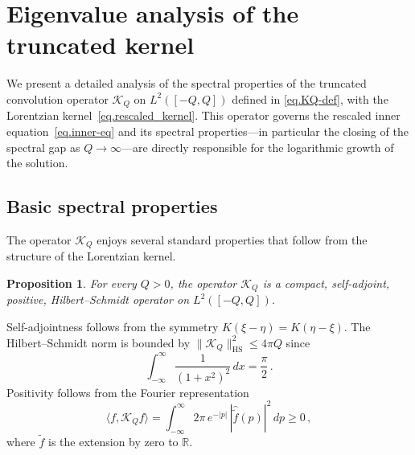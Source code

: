 \documentclass[11pt,a4paper]{article}
\newtheorem{proposition}[theorem]{Proposition}
\theoremstyle{definition}
\begin{document}





\appendix



\section{Eigenvalue analysis of the truncated kernel}
\label{app.eigenvalues}

We present a detailed analysis of the spectral properties of the truncated
convolution operator $\mathcal{K}_Q$ on $L^2([-Q,Q])$ defined in
\eqref{eq.KQ-def}, with the Lorentzian kernel~\eqref{eq.rescaled_kernel}.
This operator governs the rescaled inner equation~\eqref{eq.inner-eq}
and its spectral properties---in particular the closing of the spectral gap
as $Q\to\infty$---are directly responsible for the logarithmic growth of the
solution.

\subsection{Basic spectral properties}

The operator $\mathcal{K}_Q$ enjoys several standard properties that follow from the structure of the Lorentzian kernel.

\begin{proposition}\label{prop:basic-spectral}
For every $Q > 0$, the operator $\mathcal{K}_Q$ is a compact, self-adjoint, positive, Hilbert--Schmidt operator on $L^2([-Q,Q])$.
\end{proposition}

Self-adjointness follows from the symmetry $K(\xi - \eta) = K(\eta - \xi)$.
The Hilbert--Schmidt norm is bounded by $\|\mathcal{K}_Q\|_{\mathrm{HS}}^2 \leq 4\pi Q$ since
\begin{equation}
  \int_{-\infty}^{\infty} \frac{1}{\left(1+x^2\right)^2}  \,dx = \frac{\pi}{2}\,.
\end{equation}
Positivity follows from the Fourier representation
\begin{equation}
  \langle f, \mathcal{K}_Q f\rangle = \int_{-\infty}^{\infty} 2\pi\,e^{-|p|}\,|\hat{\tilde f}(p)|^2\,dp \geq 0\,,
\end{equation}
where $\tilde f$ is the extension by zero to $\mathbb{R}$.
\end{document}
